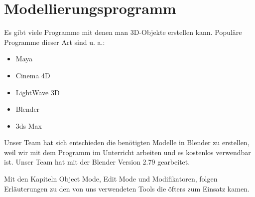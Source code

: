 \section{Modellierungsprogramm}
Es gibt viele Programme mit denen man 3D-Objekte erstellen kann.\citep{wiki:modellierungsprogramm_beispiele}
Populäre Programme dieser Art sind u. a.:

\begin{itemize}
    \item Maya
    \item Cinema 4D
    \item LightWave 3D
    \item Blender
    \item 3ds Max
\end{itemize}

Unser Team hat sich entschieden die benötigten Modelle in Blender zu erstellen, weil wir mit dem Programm im Unterricht arbeiten und
es kostenlos verwendbar ist. Unser Team hat mit der Blender Version 2.79 gearbeitet.

Mit den Kapiteln Object Mode, Edit Mode und Modifikatoren, folgen Erläuterungen zu
den von uns verwendeten Tools die öfters zum Einsatz kamen.
